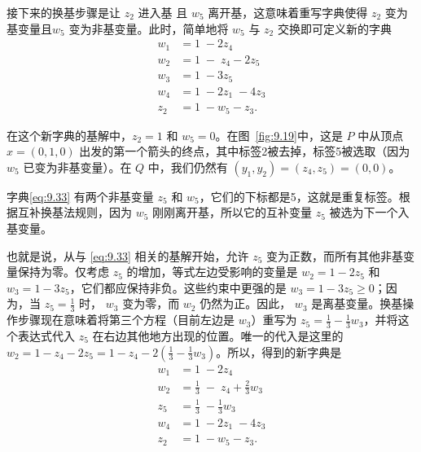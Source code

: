 接下来的换基步骤是让 \({z}_{2}\) 进入基 且 \({w}_{5}\) 离开基，这意味着重写字典使得 \({z}_{2}\) 变为基变量且\({w}_{5}\) 变为非基变量。此时，简单地将 \({w}_{5}\) 与 \({z}_{2}\) 交换即可定义新的字典
\begin{equation}
\label{eq:9.33}
\begin{aligned}
{w}_{1} & = 1\; - 2{z}_{4} \\
{w}_{2} & = 1\; - \;{z}_{4} - 2{z}_{5} \\
{w}_{3} & = 1\; - 3{z}_{5} \\
{w}_{4} & = 1\; - 2{z}_{1}\; - 4{z}_{3}  \\
{z}_{2}  & = 1\; - {w}_{5} - {z}_{3}.
\end{aligned}
\end{equation}


在这个新字典的基解中，\({z}_{2} = 1\) 和 \({w}_{5} = 0\)。在图~\ref{fig:9.19}中，这是 \(P\) 中从顶点 \(x = \left( {0,1,0}\right)\) 出发的第一个箭头的终点，其中标签2被去掉，标签5被选取（因为 \({w}_{5}\) 已变为非基变量）。在 \(Q\) 中，我们仍然有 \(\left( {{y}_{1},{y}_{2}}\right)  = \left( {{z}_{4},{z}_{5}}\right)  = \left( {0,0}\right)\)。


字典\eqref{eq:9.33} 有两个非基变量 \({z}_{5}\) 和 \({w}_{5}\)，它们的下标都是5，这就是重复标签。根据互补换基法规则，因为 \({w}_{5}\) 刚刚离开基，所以它的互补变量 \({z}_{5}\) 被选为下一个入基变量。


也就是说，从与 \eqref{eq:9.33} 相关的基解开始，允许 \({z}_{5}\) 变为正数，而所有其他非基变量保持为零。仅考虑 \({z}_{5}\) 的增加，等式左边受影响的变量是 \({w}_{2} = 1 - 2{z}_{5}\) 和 \({w}_{3} = 1 - 3{z}_{5}\)，它们都应保持非负。这些约束中更强的是 \({w}_{3} = 1 - 3{z}_{5} \geq  0\)；因为，当 \({z}_{5} = \frac{1}{3}\) 时， \({w}_{3}\) 变为零，而 \({w}_{2}\) 仍然为正。因此， \({w}_{3}\) 是离基变量。换基操作步骤现在意味着将第三个方程（目前左边是 \({w}_{3}\)）重写为 \({z}_{5} = \frac{1}{3} - \frac{1}{3}{w}_{3}\)，并将这个表达式代入 \({z}_{5}\) 在右边其他地方出现的位置。唯一的代入是这里的 \({w}_{2} = 1 - {z}_{4} - 2{z}_{5} = 1 - {z}_{4} - 2\left( {\frac{1}{3} - \frac{1}{3}{w}_{3}}\right)\)。所以，得到的新字典是
\begin{equation}
\label{eq:9.34}
\begin{aligned}
{w}_{1} & = 1\; - 2{z}_{4} \\
{w}_{2} & = \frac{1}{3}\; - \;{z}_{4} + \frac{2}{3}{w}_{3}\\
{z}_{5} & = \frac{1}{3}\; - \frac{1}{3}{w}_{3}\\
{w}_{4} & = 1\; - 2{z}_{1}\; - 4{z}_{3}  \\
{z}_{2}  & = 1\; - {w}_{5} - {z}_{3}.
\end{aligned}
\end{equation}


